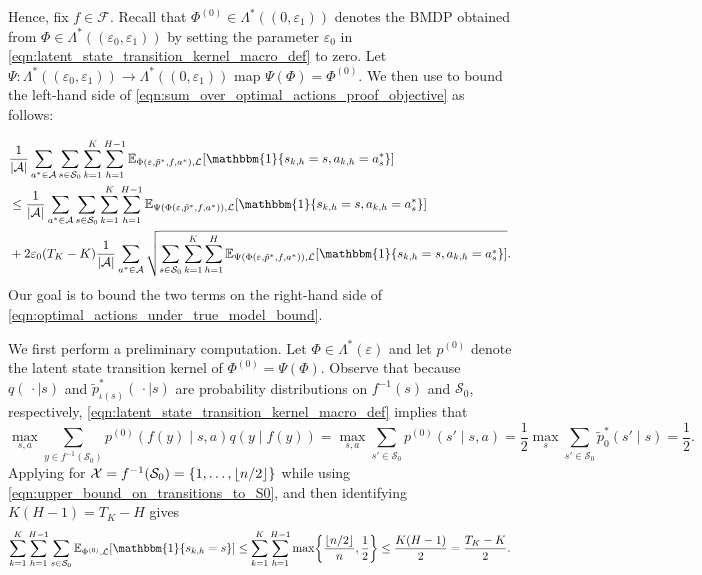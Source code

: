 \documentclass[11pt]{article}
\newcommand{\mcA}{\mathcal{A}}
\newcommand{\mcF}{\mathcal{F}}
\newcommand{\mcL}{\mathcal{L}}
\newcommand{\mcS}{\mathcal{S}}
\newcommand{\mcX}{\mathcal{X}}
\newcommand{\mbbE}{\mathbb{E}}
\DeclarePairedDelimiter\floor{\lfloor}{\rfloor}
\theoremstyle{definition}
\theoremstyle{definition}
\begin{document}
Hence, fix $f\in\mcF$.
Recall that $\Phi^{(0)}\in \Lambda^*((0,\varepsilon_1))$ denotes the \gls{BMDP} obtained from $\Phi\in\Lambda^*((\varepsilon_0,\varepsilon_1))$ by setting the parameter $\varepsilon_0$ in \eqref{eqn:latent_state_transition_kernel_macro_def} to zero.
Let $\Psi:\Lambda^*((\varepsilon_0,\varepsilon_1))\rightarrow \Lambda^*((0,\varepsilon_1))$ map $\Psi(\Phi)=\Phi^{(0)}$.
We then use  to bound the left-hand side of \eqref{eqn:sum_over_optimal_actions_proof_objective} as follows:

\begin{align}
	 &
	\frac{1}{|\mcA|}
	\sum_{a^*\in\mcA}
	\sum_{s\in\mcS_0}
	\sum_{k=1}^K
	\sum_{h=1}^{H-1}
	\mbbE_{\Phi(\varepsilon,\tilde{p}^*,f,a^*),\mcL}[\mathbbm{1}\{s_{k,h}=s,a_{k,h}=a_s^*\}]
	\nonumber
	\\
	 &
	\leq
	\frac{1}{|\mcA|}
	\sum_{a^*\in\mcA}
	\sum_{s\in\mcS_0}
	\sum_{k=1}^K
	\sum_{h=1}^{H-1}
	\mbbE_{\Psi(\Phi(\varepsilon,\tilde{p}^*,f,a^*)),\mcL}[\mathbbm{1}\{s_{k,h}=s,a_{k,h}=a_s^*\}]
	\label{eqn:optimal_actions_under_true_model_bound}
	\\
	 &
	+
	2\varepsilon_0(T_K-K)
	\frac{1}{|\mcA|}
	\sum_{a^*\in\mcA}
	\sqrt{
	\sum_{s\in\mcS_0}
	\sum_{k=1}^K
	\sum_{h=1}^H
	\mbbE_{\Psi(\Phi(\varepsilon,\tilde{p}^*,f,a^*)),\mcL}[\mathbbm{1}\{s_{k,h}=s,a_{k,h}=a_s^*\}]
	}
	.\nonumber
\end{align}
Our goal is to bound the two terms on the right-hand side of \eqref{eqn:optimal_actions_under_true_model_bound}.

We first perform a preliminary computation.
Let $\Phi\in \Lambda^*(\varepsilon)$ and let $p^{(0)}$ denote the latent state transition kernel of $\Phi^{(0)}=\Psi(\Phi)$.
Observe that because $q(\,\cdot \mid s)$ and $\tilde{p}^*_{\iota(s)}(\,\cdot\mid s)$ are probability distributions on $f^{-1}(s)$ and $\mcS_0$, respectively, \eqref{eqn:latent_state_transition_kernel_macro_def} implies that
\begin{equation}
	\label{eqn:upper_bound_on_transitions_to_S0}
	\max_{s,a}
	\sum_{y\in f^{-1}(\mcS_0)}p^{(0)}(f(y) \mid s,a)q(y\mid f(y))
	=
	\max_{s,a}
	\sum_{s'\in\mcS_0}p^{(0)}(s' \mid s,a)
	=
	\frac{1}{2}\max_{s}\sum_{s'\in\mcS_0}\tilde{p}^*_{0}(s'\mid s)
	=
	\frac{1}{2}.
\end{equation}
Applying  for $\mcX=f^{-1}(\mcS_0)=\{1,\ldots,\floor{n/2}\}$ while using \eqref{eqn:upper_bound_on_transitions_to_S0}, and then identifying $K(H-1)=T_K-H$ gives
\begin{equation}
	\label{eqn:maximum_visitation_rate_of_S0}
	\sum_{k=1}^K
	\sum_{h=1}^{H-1}
	\sum_{s\in\mcS_0}
	\mbbE_{\Phi^{(0)},\mcL}[\mathbbm{1}\{s_{k,h}=s\}]
	\leq
	\sum_{k=1}^K
	\sum_{h=1}^{H-1}
	\max
	\biggl\{\frac{\floor{n/2}}{n},\frac{1}{2}\biggr\}
	\leq
	\frac{K(H-1)}{2}
	=
	\frac{T_K-K}{2}
	.
\end{equation}
\end{document}

